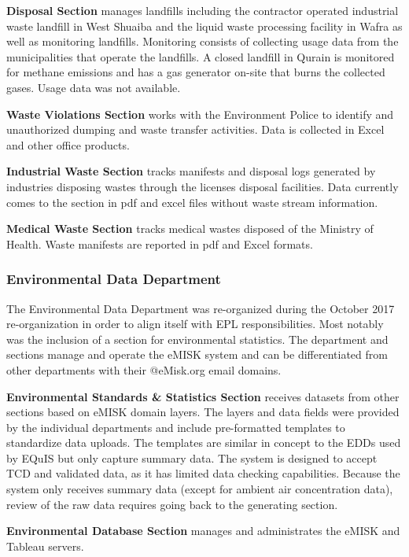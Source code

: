 \textbf{Disposal Section} manages landfills including the contractor operated industrial waste landfill in West Shuaiba and the liquid waste processing facility in Wafra as well as monitoring landfills. Monitoring consists of collecting usage data from the municipalities that operate the landfills. A closed landfill in Qurain is monitored for methane emissions and has a gas generator on-site that burns the collected gases. Usage data was not available.

\textbf{Waste Violations Section} works with the Environment Police to identify and unauthorized dumping and waste transfer activities. Data is collected in Excel and other office products.

\textbf{Industrial Waste Section} tracks manifests and disposal logs generated by industries disposing wastes through the licenses disposal facilities. Data currently comes to the section in pdf and excel files without waste stream information.

\textbf{Medical Waste Section} tracks medical wastes disposed of the Ministry of Health. Waste manifests are reported in pdf and Excel formats.

\subsubsection{Environmental Data Department}
The Environmental Data Department was re-organized during the October 2017 re-organization in order to align itself with EPL responsibilities. Most notably was the inclusion of a section for environmental statistics. The department and sections manage and operate the  eMISK system and can be differentiated from other departments with their @eMisk.org email domains.  

\textbf{Environmental Standards \& Statistics Section} receives datasets from other sections based on eMISK domain layers. The layers and data fields were provided by the individual departments and include pre-formatted templates to standardize data uploads. The templates are similar in concept to the EDDs used by EQuIS but only capture summary data. The system is designed to accept TCD and validated data, as it has limited data checking capabilities. Because the system only receives summary data (except for ambient air concentration data), review of the raw data requires going back to the generating section.

\textbf{Environmental Database Section} manages and administrates the eMISK and Tableau servers.

